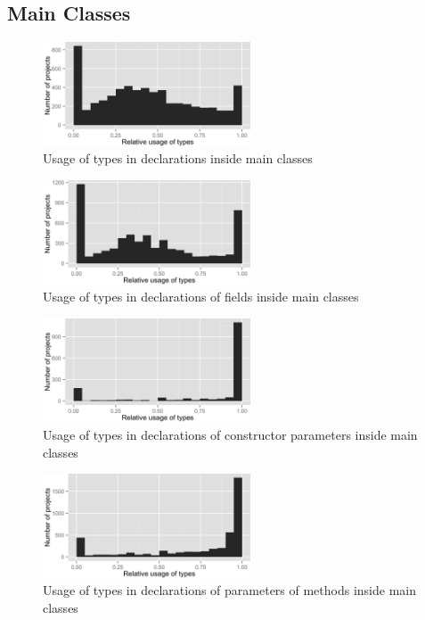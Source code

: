 \FloatBarrier
\subsection*{Main Classes}

\begin{figure}[h]
\centering 
\includegraphics[width=0.55\textwidth]{../aosd_2014/analysis/result/test/main/histograms/5_all.png} 
\caption{Usage of types in declarations inside main classes}
\end{figure}

\begin{figure}[h]
\centering 
\includegraphics[width=0.55\textwidth]{../aosd_2014/analysis/result/test/main/histograms/10_Field.png} 
\caption{Usage of types in declarations of fields inside main classes}
\end{figure}

\begin{figure}[h]
\centering 
\includegraphics[width=0.55\textwidth]{../aosd_2014/analysis/result/test/main/histograms/9_Constructor_Parameter.png} 
\caption{Usage of types in declarations of constructor parameters inside main classes}
\end{figure}

\begin{figure}[h]
\centering 
\includegraphics[width=0.55\textwidth]{../aosd_2014/analysis/result/test/main/histograms/8_Method_Parameter.png} 
\caption{Usage of types in declarations of parameters of methods inside main classes}
\end{figure}

